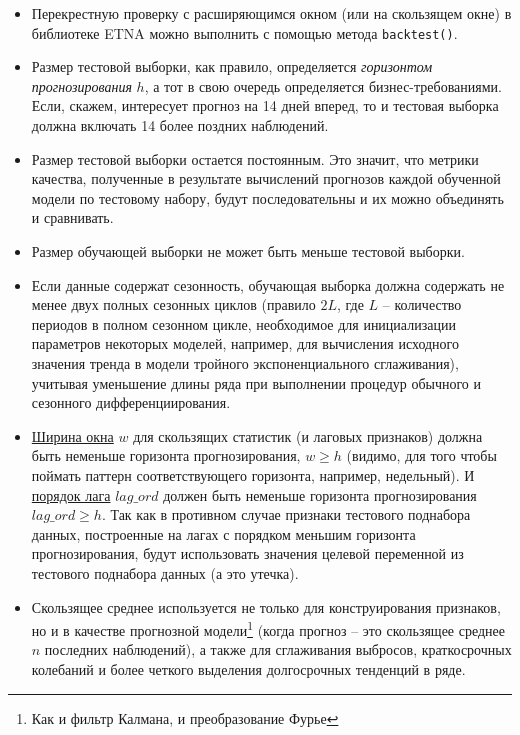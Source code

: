 \documentclass[%
	11pt,
	a4paper,
	utf8,
		]{article}
\begin{document}
\begin{itemize}
	\item Перекрестную проверку с расширяющимся окном (или на скользящем окне) в библиотеке ETNA можно выполнить с помощью метода \verb|backtest()|. 
	
	\item Размер тестовой выборки, как правило, определяется \emph{горизонтом прогнозирования} $ h $, а тот в свою очередь определяется бизнес-требованиями. Если, скажем, интересует прогноз на 14 дней вперед, то и тестовая выборка должна включать 14 более поздних наблюдений.
	
	\item Размер тестовой выборки остается постоянным. Это значит, что метрики качества, полученные в результате вычислений прогнозов каждой обученной модели по тестовому набору, будут последовательны и их можно объединять и сравнивать.
	
	\item Размер обучающей выборки не может быть меньше тестовой выборки.
	
	\item Если данные содержат сезонность, обучающая выборка должна содержать не менее двух полных сезонных циклов (правило $ 2 L $, где $ L $ -- количество периодов в полном сезонном цикле, необходимое для инициализации параметров некоторых моделей, например, для вычисления исходного значения тренда в модели тройного экспоненциального сглаживания), учитывая уменьшение длины ряда при выполнении процедур обычного и сезонного дифференциирования.
	
	\item {\color{blue} \underline{Ширина окна} $ w $ для скользящих статистик (и лаговых признаков) должна быть неменьше горизонта прогнозирования, $ w \geqslant h $ (видимо, для того чтобы поймать паттерн соответствующего горизонта, например, недельный). И \underline{порядок лага} $ lag\_ord $ должен быть неменьше горизонта прогнозирования $ lag\_ord \geqslant h $. Так как в противном случае признаки тестового поднабора данных, построенные на лагах с порядком меньшим горизонта прогнозирования, будут использовать значения целевой переменной из тестового поднабора данных (а это утечка)}.
	
	\item Скользящее среднее используется не только для конструирования признаков, но и в качестве прогнозной модели\footnote{Как и фильтр Калмана, и преобразование Фурье} (когда прогноз -- это скользящее среднее $ n $ последних наблюдений), а также для сглаживания выбросов, краткосрочных колебаний и более четкого выделения долгосрочных тенденций в ряде.
\end{itemize}
\end{document}
